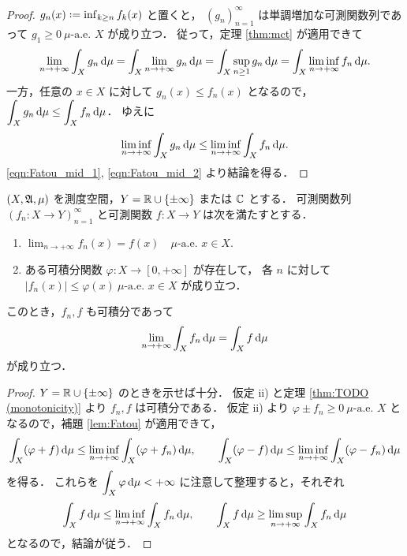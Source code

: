 \begin{proof}
    $g_n(x)\defeq\inf_{k\ge n}f_k(x)$ と置くと，
    $(g_n)_{n=1}^\infty$ は単調増加な可測関数列であって $g_1\ge0\ \text{$\mu$-a.e.\ $X$}$ が成り立つ．
    従って，定理 \ref{thm:mct} が適用できて
    \begin{align}
        \lim_{n\to+\infty}\int_Xg_n\,\mathrm{d}\mu
        =\int_X\lim_{n\to+\infty}g_n\,\mathrm{d}\mu
        =\int_X\sup_{n\ge1}g_n\,\mathrm{d}\mu
        =\int_X\liminf_{n\to+\infty}f_n\,\mathrm{d}\mu.\label{eqn:Fatou_mid_1}
    \end{align}
    一方，任意の $x\in X$ に対して $g_n(x)\le f_n(x)$ となるので，$\displaystyle\int_Xg_n\,\mathrm{d}\mu\le\int_Xf_n\,\mathrm{d}\mu$．
    ゆえに
    \begin{align}
        \liminf_{n\to+\infty}\int_Xg_n\,\mathrm{d}\mu\le\liminf_{n\to+\infty}\int_Xf_n\,\mathrm{d}\mu.
        \label{eqn:Fatou_mid_2}
    \end{align}
    \eqref{eqn:Fatou_mid_1}, \eqref{eqn:Fatou_mid_2} より結論を得る．
\end{proof}

\begin{theorem}
    $(X,\mathfrak{A},\mu)$ を測度空間，$Y=\mathbb{R}\cup\{\pm\infty\}$ または $\mathbb{C}$ とする．
    可測関数列 $(f_n:X\to Y)_{n=1}^\infty$ と可測関数 $f:X\to Y$ は次を満たすとする．
    \begin{enumerate}
        \item $\displaystyle\lim_{n\to+\infty}f_n(x)=f(x)\quad\text{$\mu$-a.e.\ $x\in X$}$.
        \item ある可積分関数 $\varphi:X\to[0,+\infty]$ が存在して，
            各 $n$ に対して $|f_n(x)|\le\varphi(x)\ \text{$\mu$-a.e.\ $x\in X$}$ が成り立つ．
    \end{enumerate}
    このとき，$f_n,f$ も可積分であって
    \begin{align*}
        \lim_{n\to+\infty}\int_Xf_n\,\mathrm{d}\mu=\int_Xf\,\mathrm{d}\mu
    \end{align*}
    が成り立つ．
\end{theorem}

\begin{proof}
    $Y=\mathbb{R}\cup\{\pm\infty\}$ のときを示せば十分．
    仮定 \textrm{ii)} と定理 \ref{thm:TODO (monotonicity)} より $f_n,f$ は可積分である．
    仮定 \textrm{ii)} より $\varphi\pm f_n\ge0\ \text{$\mu$-a.e.\ $X$}$ となるので，補題 \ref{lem:Fatou} が適用できて，
    \begin{align*}
        \int_X(\varphi+f)\,\mathrm{d}\mu\le\liminf_{n\to+\infty}\int_X(\varphi+f_n)\,\mathrm{d}\mu,\qquad
        \int_X(\varphi-f)\,\mathrm{d}\mu\le\liminf_{n\to+\infty}\int_X(\varphi-f_n)\,\mathrm{d}\mu
    \end{align*}
    を得る．
    これらを $\displaystyle\int_X\varphi\,\mathrm{d}\mu<+\infty$ に注意して整理すると，それぞれ
    \begin{align*}
        \int_Xf\,\mathrm{d}\mu\le\liminf_{n\to+\infty}\int_Xf_n\,\mathrm{d}\mu,\qquad
        \int_Xf\,\mathrm{d}\mu\ge\limsup_{n\to+\infty}\int_Xf_n\,\mathrm{d}\mu
    \end{align*}
    となるので，結論が従う．
\end{proof}
